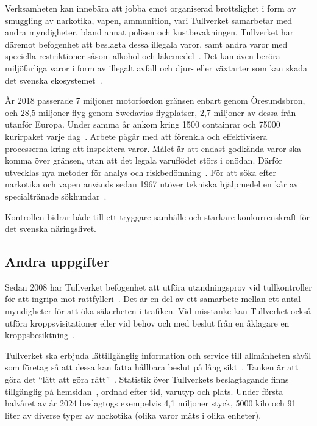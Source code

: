 Verksamheten kan innebära att jobba emot organiserad brottslighet i form av
smuggling av narkotika, vapen, ammunition, vari Tullverket samarbetar med andra
myndigheter, bland annat polisen och kustbevakningen.
%
Tullverket har däremot befogenhet att beslagta dessa illegala varor, samt andra
varor med speciella restriktioner såsom alkohol och läkemedel~\cite{beslag}.
%
Det kan även beröra miljöfarliga varor i form av illegalt avfall och djur-
eller växtarter som kan skada det svenska ekosystemet~\cite{wikipedia}.

År 2018 passerade 7 miljoner motorfordon gränsen enbart genom Öresundsbron,
och 28,5 miljoner flyg genom Swedavias flygplatser, 2,7 miljoner av dessa från
utanför Europa. Under samma år ankom kring 1500 containrar och 75000
kurirpaket varje dag~\cite{granskning}.
%
Arbete pågår med att förenkla och effektivisera processerna kring att
inspektera varor. Målet är att endast godkända varor ska komma över gränsen,
utan att det legala varuflödet störs i onödan. Därför utvecklas nya metoder
för analys och riskbedömning~\cite{vision}.
%
För att söka efter narkotika och vapen används sedan 1967 utöver tekniska
hjälpmedel en kår av specialtränade sökhundar~\cite{sokhundar}.

Kontrollen bidrar både till ett tryggare samhälle och starkare konkurrenskraft
för det svenska näringslivet.

\subsection{Andra uppgifter}

Sedan 2008 har Tullverket befogenhet att utföra utandningsprov vid
tullkontroller för att ingripa mot rattfylleri~\cite{rattfylleri}. Det är en
del av ett samarbete mellan ett antal myndigheter för att öka säkerheten
i trafiken.
%
Vid misstanke kan Tullverket också utföra kroppsvisitationer eller vid behov
och med beslut från en åklagare en kroppsbesiktning~\cite{visitation}.

Tullverket ska erbjuda lättillgänglig information och service till
allmänheten såväl som företag så att dessa kan fatta hållbara beslut på
lång sikt~\cite{forordning}. Tanken är att göra det
``lätt att göra rätt''~\cite{vision}.
%
Statistik över Tullverkets beslagtagande finns tillgänglig på
hemsidan~\cite{statistik}, ordnad efter tid, varutyp och plats. Under första
halvåret av år 2024 beslagtogs exempelvis 4,1 miljoner styck, 5000 kilo och 91
liter av diverse typer av narkotika (olika varor mäts i olika enheter).
